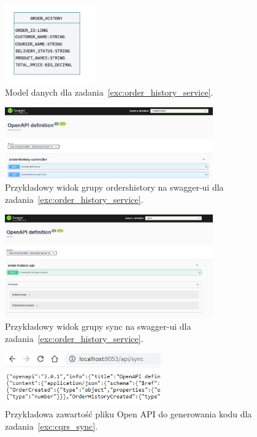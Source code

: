 \documentclass[12pt]{article}
\begin{document}
    \begin{figure}[p]
        \centering
        \includegraphics[width=0.35\textwidth]{read-model.png}
        \caption{Model danych dla zadania~\ref{exc:order_history_service}.}
        \label{fig:read-model}
    \end{figure}  
    \begin{figure}[p]
        \centering
        \includegraphics[width=0.8\textwidth]{lista-3-2-a}
        \caption{Przykładowy widok grupy ordershistory na swagger-ui dla zadania~\ref{exc:order_history_service}.}
        \label{fig:swagger-orders-gr}
    \end{figure}  
    \begin{figure}[p]
        \centering
        \includegraphics[width=0.8\textwidth]{lista-3-2-b}
        \caption{Przykładowy widok grupy sync na swagger-ui dla zadania~\ref{exc:order_history_service}.}
        \label{fig:swagger-sync-gr}
    \end{figure}
    \begin{figure}[p]
        \centering
        \includegraphics[width=0.6\textwidth]{lista-3-3-a}
        \caption{Przykładowa zawartość pliku Open API do generowania kodu dla zadania~\ref{exc:cqrs_sync}.}
        \label{fig:openapi-gen}
    \end{figure}
\end{document}
